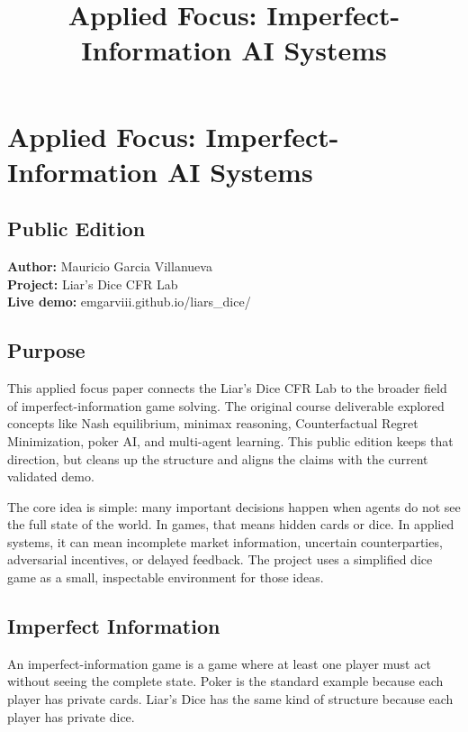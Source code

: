 \documentclass[
]{article}
\title{Applied Focus: Imperfect-Information AI Systems}
\author{}
\date{}
\begin{document}
\maketitle

\section{Applied Focus: Imperfect-Information AI
Systems}\label{applied-focus-imperfect-information-ai-systems}

\subsection{Public Edition}\label{public-edition}

\textbf{Author:} Mauricio Garcia Villanueva\\
\textbf{Project:} Liar's Dice CFR Lab\\
\textbf{Live demo:} emgarviii.github.io/liars\_dice/

\subsection{Purpose}\label{purpose}

This applied focus paper connects the Liar's Dice CFR Lab to the broader
field of imperfect-information game solving. The original course
deliverable explored concepts like Nash equilibrium, minimax reasoning,
Counterfactual Regret Minimization, poker AI, and multi-agent learning.
This public edition keeps that direction, but cleans up the structure
and aligns the claims with the current validated demo.

The core idea is simple: many important decisions happen when agents do
not see the full state of the world. In games, that means hidden cards
or dice. In applied systems, it can mean incomplete market information,
uncertain counterparties, adversarial incentives, or delayed feedback.
The project uses a simplified dice game as a small, inspectable
environment for those ideas.

\subsection{Imperfect Information}\label{imperfect-information}

An imperfect-information game is a game where at least one player must
act without seeing the complete state. Poker is the standard example
because each player has private cards. Liar's Dice has the same kind of
structure because each player has private dice.
\end{document}
